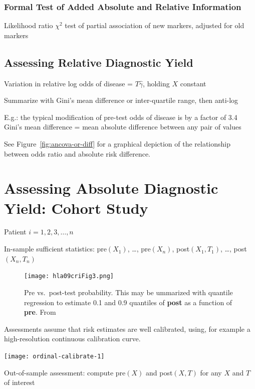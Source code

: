 \subsubsection{Formal Test of Added Absolute and Relative Information}
Likelihood ratio $\chi^{2}$ test of partial association
of new markers, adjusted for old markers

\subsection{Assessing Relative Diagnostic Yield}
\bi
\item Variation in relative log odds of disease = $T \hat{\gamma}$,
holding $X$ constant
\item Summarize with Gini's mean difference or inter-quartile range,
then anti-log
\item E.g.: the typical modification of pre-test odds of disease is by
a factor of 3.4
\ei
{\smaller Gini's mean difference = mean absolute difference between any
pair of values}

See Figure~\ref{fig:ancova-or-diff} for a graphical depiction of the relationship between odds ratio and absolute risk difference.

\section{Assessing Absolute Diagnostic Yield: Cohort Study}
\bi
\item Patient $i = 1, 2, 3, \ldots, n$
\item In-sample sufficient statistics: pre$(X_{1})$, \ldots,
pre$(X_{n})$, post$(X_{1}, T_{1})$, \ldots, post$(X_{n}, T_{n})$
\ei

\begin{figure}[!htbp]\leavevmode
\centerline{\texttt{[image: hla09criFig3.png]}}
\caption{Pre vs.\ post-test probability.  This may be ummarized with quantile regression to estimate 0.1 and 0.9 quantiles of \textbf{post} as a function of \textbf{pre}.  From~\citet{hla09cri}}
\end{figure}

Assessments assume that risk estimates are well calibrated, using, for example a high-resolution continuous calibration curve.

\centerline{\texttt{[image: ordinal-calibrate-1]}}

Out-of-sample assessment: compute pre$(X)$ and post$(X,T)$ for
any $X$ and $T$ of interest
